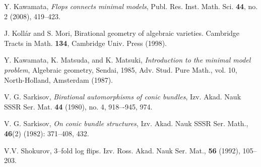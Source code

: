 \documentclass[11pt]{amsart}
\numberwithin{equation}{section}
\theoremstyle{definition}
\theoremstyle{remark}
\theoremstyle{definition}
\begin{document}
\begin{thebibliography}{99}
 Y. Kawamata, \textit{Flops connects minimal models}, Publ. Res. Inst. Math. Sci. \textbf{44}, no. 2 (2008), 419--423.

	 J. Koll\'{a}r and S. Mori, {Birational geometry of algebraic varieties}. Cambridge Tracts in Math. \textbf{134}, Cambridge Univ. Press (1998).

 Y. Kawamata, K. Matsuda, and K. Matsuki, \textit{Introduction to the minimal model problem}, Algebraic geometry, Sendai, 1985, Adv. Stud. Pure Math., vol. 10, North-Holland, Amsterdam (1987).


 V. G. Sarkisov, \textit{Birational automorphisms of conic bundles}, Izv. Akad. Nauk SSSR Ser. Mat. \textbf{44} (1980), no. 4, 918–-945, 974.

 V. G. Sarkisov, \textit{On conic bundle structures}, Izv. Akad. Nauk SSSR Ser. Math., \textbf{46}(2) (1982): 371--408, 432.

	 V.V. Shokurov, {3--fold log flips}. Izv. Ross. Akad. Nauk Ser. Mat., \textbf{56} (1992), 105--203. 
	
\end{thebibliography}
\end{document}
